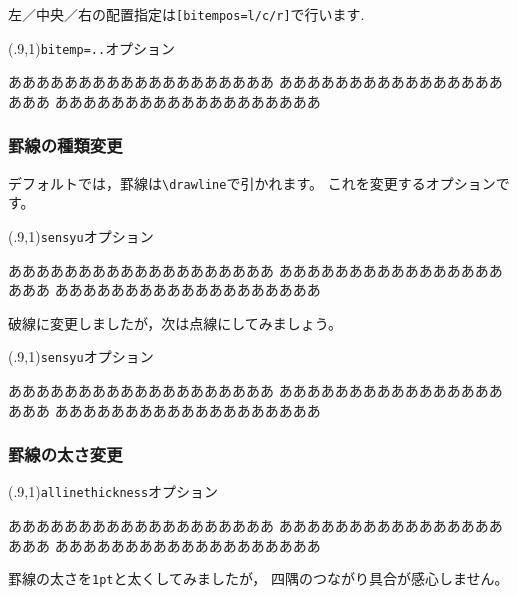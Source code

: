 左／中央／右の配置指定は\verb+[bitempos=l/c/r]+で行います.

\begin{showEx}(.9,1){\texttt{bitemp=..}オプション}
\begin{rectbox}[bitem={~下見出し~},bitempos=c]
あああああああああああああああああああ
あああああああああああああああああああ
あああああああああああああああああああ
\end{rectbox}
\end{showEx}

\subsubsection{罫線の種類変更}
デフォルトでは，罫線は\verb+\drawline+で引かれます。
これを変更するオプションです。

\begin{showEx}(.9,1){\texttt{sensyu}オプション}
\begin{rectbox}[sensyu=\hasen]
あああああああああああああああああああ
あああああああああああああああああああ
あああああああああああああああああああ
\end{rectbox}
\end{showEx}

破線に変更しましたが，次は点線にしてみましょう。

\begin{showEx}(.9,1){\texttt{sensyu}オプション}
\begin{rectbox}[sensyu=\dottedline{.2}]
あああああああああああああああああああ
あああああああああああああああああああ
あああああああああああああああああああ
\end{rectbox}
\end{showEx}

\subsubsection{罫線の太さ変更}

\begin{showEx}(.9,1){\texttt{allinethickness}オプション}
\begin{rectbox}[allinethickness=1pt]
あああああああああああああああああああ
あああああああああああああああああああ
あああああああああああああああああああ
\end{rectbox}
\end{showEx}

罫線の太さを\texttt{1pt}と太くしてみましたが，
四隅のつながり具合が感心しません。


